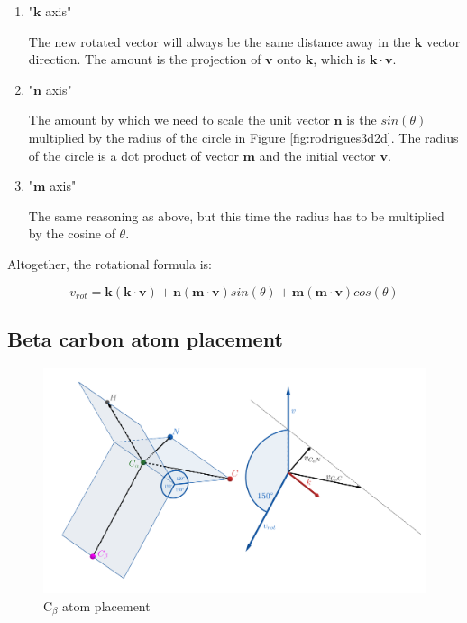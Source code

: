 \begin{enumerate}
    \item "$\bm{k}$ axis"
    
    The new rotated vector will always be the same distance away in the $\bm{k}$ vector direction. The amount is the projection of $\bm{v}$ onto $\bm{k}$, which is $\bm{k} \cdot \bm{v}$.
    
    \item "$\bm{n}$ axis"
    
    The amount by which we need to scale the unit vector $\bm{n}$ is the $sin(\theta)$ multiplied by the radius of the circle in Figure \ref{fig:rodrigues3d2d}. The radius of the circle is a dot product of vector $\bm{m}$ and the initial vector $\bm{v}$.
    
    \item "$\bm{m}$ axis"
    
    The same reasoning as above, but this time the radius has to be multiplied by the cosine of $\theta$.
\end{enumerate}

Altogether, the rotational formula is:

\begin{equation}
    v_{rot} = \bm{k}(\bm{k} \cdot \bm{v}) + \bm{n} (\bm{m} \cdot \bm{v}) sin(\theta) + \bm{m} (\bm{m} \cdot \bm{v}) cos(\theta)
    \label{eq:rotformula}
\end{equation}

\subsection{Beta carbon atom placement}

\begin{figure}
    \centering
    \includegraphics[width=\linewidth]{imgs_tomas/cbeta.png}
    \caption{C$_\beta$ atom placement}
    \label{fig:cbeta}
\end{figure}

